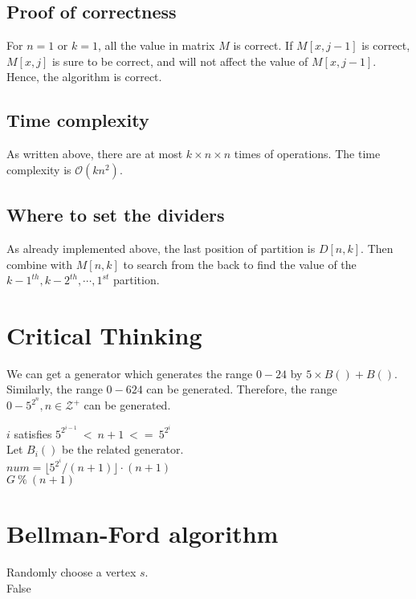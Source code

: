 \documentclass[12pt,a4paper]{article}
\theoremstyle{definition}
\begin{document}
\subsection{Proof of correctness}
For $n=1$ or $k=1$, all the value in matrix $M$ is correct. If $M[x,j-1]$ is correct, $M[x,j]$ is sure to be correct, and will not affect the value of $M[x,j-1]$. Hence, the algorithm is correct.
\subsection{Time complexity}
As written above, there are at most $k \times n \times n$ times of operations. The time complexity is $\mathcal{O}(kn^2)$.
\subsection{Where to set the dividers}
As already implemented above, the last position of partition is $D[n,k]$. Then combine with $M[n,k]$ to search from the back to find the value of the $k-1^{th},k-2^{th},\cdots,1^{st}$ partition.
\section{Critical Thinking}
We can get a generator which generates the range $0-24$ by $5 \times B()+B()$. Similarly, the range $0-624$ can be generated. Therefore, the range $0-5^{2^n},n \in \mathcal{Z^+}$ can be generated.\\
\begin{algorithm}[H]
    $i$ satisfies $5^{2^{i-1}}\ <\ n+1\ <=\ 5^{2^i}$ \\
    Let $B_i()$ be the related generator. \\
    $num = \lfloor 5^{2^i}/(n+1) \rfloor \cdot (n+1)$ \\
    \Return $G\ \%\ (n+1)$
\end{algorithm}
\section{Bellman-Ford algorithm}
\begin{algorithm}[H]
    Randomly choose a vertex $s$. \\
    \Return False
\end{algorithm}
\end{document}
